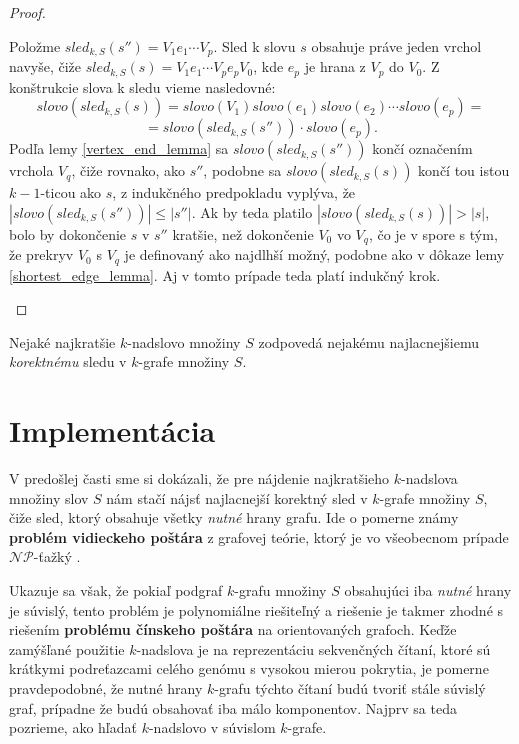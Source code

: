 \begin{proof}
\begin{itemize}
                      Položme $sled_{k,S}(s'') = V_1 e_1 \cdots V_p$. Sled k slovu $s$ obsahuje práve jeden vrchol navyše, čiže $sled_{k,S}(s) = V_1 e_1 \cdots V_p e_p V_0$,
                      kde $e_p$ je hrana z $V_p$ do $V_0$. Z konštrukcie slova k sledu vieme nasledovné: \\
                      $$slovo(sled_{k,S}(s)) = slovo(V_1) slovo(e_1) slovo(e_2) \cdots slovo(e_p) = $$
                      $$ = slovo(sled_{k,S}(s'')) \cdot slovo(e_p).$$
                        Podľa lemy \ref{vertex_end_lemma} sa $slovo(sled_{k,S}(s''))$ končí označením vrchola $V_q$, čiže rovnako, ako $s''$,
                      podobne sa $slovo(sled_{k,S}(s))$ končí tou istou $k-1$-ticou ako $s$, z indukčného predpokladu vyplýva, že $|slovo(sled_{k,S}(s''))| \leq |s''|$.
                      Ak by teda platilo $|slovo(sled_{k,S}(s))| > |s|$, bolo by dokončenie $s$ v $s''$ kratšie, než dokončenie $V_0$ vo $V_q$,
                      čo je v spore s tým, že prekryv $V_0$ s $V_q$ je definovaný ako najdlhší možný, podobne ako v dôkaze lemy \ref{shortest_edge_lemma}.
                      Aj v tomto prípade teda platí indukčný krok.
            \end{itemize}
    
\end{proof}

\begin{dosl}
    Nejaké najkratšie $k$-nadslovo množiny $S$ zodpovedá nejakému najlacnejšiemu \emph{korektnému} sledu v $k$-grafe množiny $S$.
\end{dosl}

\section{Implementácia}

V predošlej časti sme si dokázali, že pre nájdenie najkratšieho $k$-nadslova množiny slov $S$
nám stačí nájsť najlacnejší korektný sled v $k$-grafe množiny $S$, čiže sled, ktorý obsahuje
všetky \emph{nutné} hrany grafu. Ide o pomerne známy \textbf{problém vidieckeho poštára} z grafovej teórie,
ktorý je vo všeobecnom prípade $\mathcal{NP}$-ťažký \cite{ruralpostman}.

Ukazuje sa však, že pokiaľ podgraf $k$-grafu množiny $S$ obsahujúci iba \emph{nutné} hrany je súvislý,
tento problém je polynomiálne riešiteľný a riešenie je takmer zhodné s riešením \textbf{problému čínskeho
poštára} na orientovaných grafoch. Keďže zamýšľané použitie $k$-nadslova je na reprezentáciu sekvenčných čítaní, ktoré sú
krátkymi podreťazcami celého genómu s vysokou mierou pokrytia, je pomerne pravdepodobné, že nutné hrany
$k$-grafu týchto čítaní budú tvoriť stále súvislý graf, prípadne že budú obsahovať iba málo komponentov.
Najprv sa teda pozrieme, ako hľadať $k$-nadslovo v súvislom $k$-grafe.

